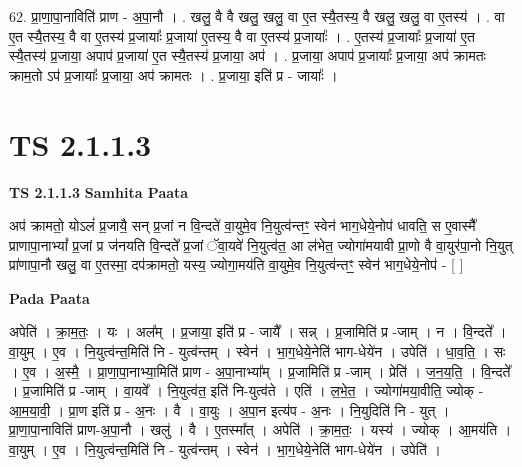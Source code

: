 \documentclass[17pt]{extarticle}
\begin{document}
62. प्रा॒णा॒पा॒नाविति॑ प्राण - अ॒पा॒नौ । . खलु॒ वै वै खलु॒ खलु॒ वा ए॒त स्यै॒तस्य॒ वै खलु॒ खलु॒ वा ए॒तस्य॑ । . वा ए॒त स्यै॒तस्य॒ वै वा ए॒तस्य॑ प्र॒जायाः᳚ प्र॒जाया॑ ए॒तस्य॒ वै वा ए॒तस्य॑ प्र॒जायाः᳚ । . ए॒तस्य॑ प्र॒जायाः᳚ प्र॒जाया॑ ए॒त स्यै॒तस्य॑ प्र॒जाया॒ अपाप॑ प्र॒जाया॑ ए॒त स्यै॒तस्य॑ प्र॒जाया॒ अप॑ । . प्र॒जाया॒ अपाप॑ प्र॒जायाः᳚ प्र॒जाया॒ अप॑ क्रामतः क्राम॒तो ऽप॑ प्र॒जायाः᳚ प्र॒जाया॒ अप॑ क्रामतः । . प्र॒जाया॒ इति॑ प्र - जायाः᳚ । \newline
\pagebreak
{}

\section{ TS 2.1.1.3 }

\textbf{TS 2.1.1.3 } \newline
\textbf{Samhita Paata} \newline

अप॑ क्रामतो॒ योऽलं॑ प्र॒जायै॒ सन् प्र॒जां न वि॒न्दते॑ वा॒युमे॒व नि॒युत्व॑न्तꣳ॒॒  स्वेन॑ भाग॒धेये॒नोप॑ धावति॒ स ए॒वास्मै᳚ प्राणापा॒नाभ्यां᳚ प्र॒जां प्र ज॑नयति वि॒न्दते᳚ प्र॒जां ॅवा॒यवे॑ नि॒युत्व॑त॒ आ ल॑भेत॒ ज्योगा॑मयावी प्रा॒णो वै वा॒युर॑पा॒नो नि॒युत् प्रा॑णापा॒नौ खलु॒ वा ए॒तस्मा॒ दप॑क्रामतो॒ यस्य॒ ज्योगा॒मय॑ति वा॒युमे॒व नि॒युत्व॑न्तꣳ॒॒ स्वेन॑ भाग॒धेये॒नोप॑ - [  ] \newline

\textbf{Pada Paata} \newline

अपेति॑ । क्रा॒म॒तः॒ । यः । अल᳚म् । प्र॒जाया॒ इति॑ प्र - जायै᳚ । सन्न् । प्र॒जामिति॑ प्र -जाम् । न । वि॒न्दते᳚ । वा॒युम् । ए॒व । नि॒युत्व॑न्त॒मिति॑ नि - युत्व॑न्तम् । स्वेन॑ । भा॒ग॒धेये॒नेति॑ भाग-धेये॑न । उपेति॑ । धा॒व॒ति॒ । सः । ए॒व । अ॒स्मै॒ । प्रा॒णा॒पा॒नाभ्या॒मिति॑ प्राण - अ॒पा॒नाभ्या᳚म् । प्र॒जामिति॑ प्र -जाम् । प्रेति॑ । ज॒न॒य॒ति॒ । वि॒न्दते᳚ । प्र॒जामिति॑ प्र -जाम् । वा॒यवे᳚ । नि॒युत्व॑त॒ इति॑ नि-युत्व॑ते । एति॑ । ल॒भे॒त॒ । ज्योगा॑मया॒वीति॒ ज्योक् - आ॒म॒या॒वी॒ । प्रा॒ण इति॑ प्र - अ॒नः । वै । वा॒युः । अ॒पा॒न इत्य॑प - अ॒नः । नि॒युदिति॑ नि - युत् । प्रा॒णा॒पा॒नाविति॑ प्राण-अ॒पा॒नौ । खलु॑ । वै । ए॒तस्मा᳚त् । अपेति॑ । क्रा॒म॒तः॒ । यस्य॑ । ज्योक् । आ॒मय॑ति । वा॒युम् । ए॒व । नि॒युत्व॑न्त॒मिति॑ नि - युत्व॑न्तम् । स्वेन॑ । भा॒ग॒धेये॒नेति॑ भाग-धेये॑न । उपेति॑ ।  \newline
\end{document}
